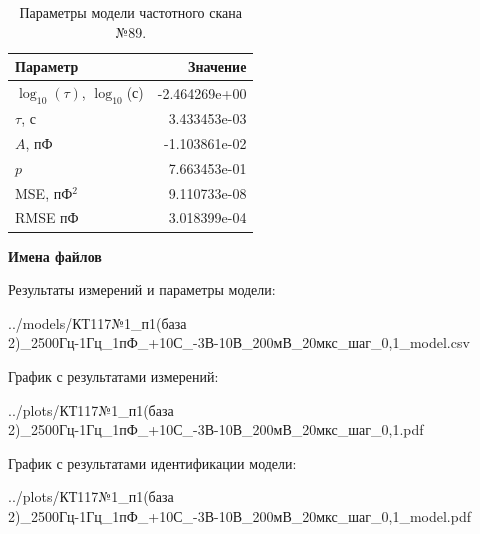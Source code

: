 \begin{table}[!ht]
    \centering
    \caption{Параметры модели частотного скана №89.}
    \begin{tabular}{|l|r|}
        \hline
        Параметр                                       & Значение                  \\ \hline
        $\log_{10}(\tau)$, $\log_{10}$(с)              & -2.464269e+00             \\ \hline
        $\tau$, с                                      & 3.433453e-03              \\ \hline
        $A$, пФ                                        & -1.103861e-02             \\ \hline
        $p$                                            & 7.663453e-01              \\ \hline
        MSE, пФ$^2$                                    & 9.110733e-08              \\ \hline
        RMSE пФ                                        & 3.018399e-04              \\ \hline
    \end{tabular}
    \label{table:frequency_scan_model_89}
\end{table}

\textbf{Имена файлов}

Результаты измерений и параметры модели:

\scriptsize../models/КТ117№1\_п1(база 2)\_2500Гц-1Гц\_1пФ\_+10С\_-3В-10В\_200мВ\_20мкс\_шаг\_0,1\_model.csv
\normalsize

График с результатами измерений:

\scriptsize../plots/КТ117№1\_п1(база 2)\_2500Гц-1Гц\_1пФ\_+10С\_-3В-10В\_200мВ\_20мкс\_шаг\_0,1.pdf
\normalsize

График с результатами идентификации модели:

\scriptsize../plots/КТ117№1\_п1(база 2)\_2500Гц-1Гц\_1пФ\_+10С\_-3В-10В\_200мВ\_20мкс\_шаг\_0,1\_model.pdf
\normalsize

